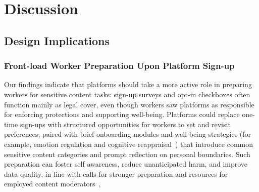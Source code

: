 \section{Discussion}
\subsection{Design Implications}

\subsubsection{Front-load Worker Preparation Upon Platform Sign-up}
Our findings indicate that platforms should take a more active role in preparing workers for sensitive content tasks: sign-up surveys and opt-in checkboxes often function mainly as legal cover, even though workers saw platforms as responsible for enforcing protections and supporting well-being.  Platforms could replace one-time sign-ups with structured opportunities for workers to set and revisit preferences, paired with brief onboarding modules and well-being strategies (for example, emotion regulation and cognitive reappraisal~\cite{spence2023content}) that introduce common sensitive content categories and prompt reflection on personal boundaries. Such preparation can foster self awareness, reduce unanticipated harm, and improve data quality, in line with calls for stronger preparation and resources for employed content moderators~\cite{qian2025aura, steiger_psychological_2021, steiger2022effects}, 


